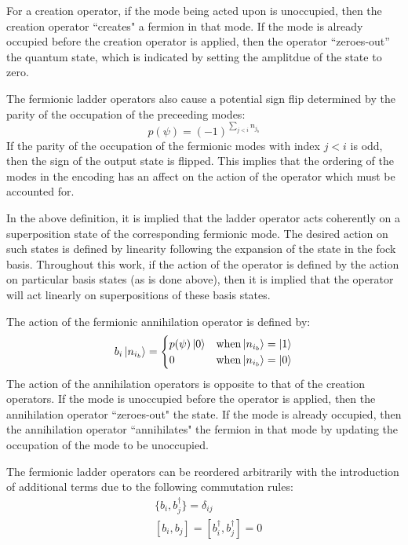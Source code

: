 For a creation operator, if the mode being acted upon is unoccupied, then the creation operator ``creates" a fermion in that mode.
If the mode is already occupied before the creation operator is applied, then the operator ``zeroes-out'' the quantum state, which is indicated by setting the amplitdue of the state to zero.

The fermionic ladder operators also cause a potential sign flip determined by the parity of the occupation of the preceeding modes:
\begin{equation}
    \label{eq:parity}
    p(\psi) = (-1)^{\sum_{j < i} n_{j_b}}
\end{equation}
If the parity of the occupation of the fermionic modes with index $j < i$ is odd, then the sign of the output state is flipped.
This implies that the ordering of the modes in the encoding has an affect on the action of the operator which must be accounted for.

In the above definition, it is implied that the ladder operator acts coherently on a superposition state of the corresponding fermionic mode.
The desired action on such states is defined by linearity following the expansion of the state in the fock basis.
Throughout this work, if the action of the operator is defined by the action on particular basis states (as is done above), then it is implied that the operator will act linearly on superpositions of these basis states. 

The action of the fermionic annihilation operator is defined by:
\begin{equation}
    \label{eq:fermionic-annihilation}
    b_i \ket{n_{i_b}} = 
    \begin{cases} 
        p(\psi) \ket{0}  & {\rm when} \ket{n_{i_b}} = \ket{1} \\
        0 & {\rm when} \ket{n_{i_b}} = \ket{0}
    \end{cases}
\end{equation}
The action of the annihilation operators is opposite to that of the creation operators.
If the mode is unoccupied before the operator is applied, then the annihilation operator ``zeroes-out" the state.
If the mode is already occupied, then the annihilation operator ``annihilates" the fermion in that mode by updating the occupation of the mode to be unoccupied.

The fermionic ladder operators can be reordered arbitrarily with the introduction of additional terms due to the following commutation rules:
\begin{equation}
    \label{eq:fermionic-commutation}
    \begin{split}
        &\{b_i, b_j^\dagger\} = \delta_{ij}\\
        & [b_i, b_j] = [b_i^\dagger, b_j^\dagger] = 0 \\
    \end{split}
\end{equation}

